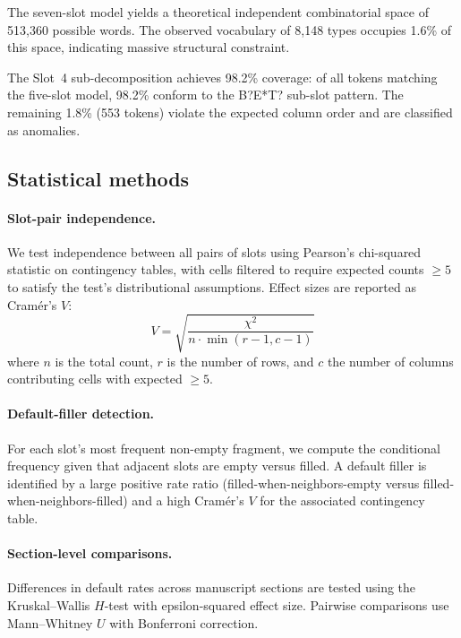 \documentclass[12pt]{article}
\begin{document}
The seven-slot model yields a theoretical independent combinatorial space of 513,360 possible words. The observed vocabulary of 8,148 types occupies 1.6\% of this space, indicating massive structural constraint.

The Slot~4 sub-decomposition achieves 98.2\% coverage: of all tokens matching the five-slot model, 98.2\% conform to the B?E*T? sub-slot pattern. The remaining 1.8\% (553 tokens) violate the expected column order and are classified as anomalies.

\subsection{Statistical methods}

\paragraph{Slot-pair independence.} We test independence between all pairs of slots using Pearson's chi-squared statistic on contingency tables, with cells filtered to require expected counts $\geq 5$ to satisfy the test's distributional assumptions. Effect sizes are reported as Cram\'{e}r's $V$:
\begin{equation}
  V = \sqrt{\frac{\chi^2}{n \cdot \min(r-1, c-1)}}
  \label{eq:cramersv}
\end{equation}
where $n$ is the total count, $r$ is the number of rows, and $c$ the number of columns contributing cells with expected $\geq 5$.

\paragraph{Default-filler detection.} For each slot's most frequent non-empty fragment, we compute the conditional frequency given that adjacent slots are empty versus filled. A default filler is identified by a large positive rate ratio (filled-when-neighbors-empty versus filled-when-neighbors-filled) and a high Cram\'{e}r's $V$ for the associated contingency table.

\paragraph{Section-level comparisons.} Differences in default rates across manuscript sections are tested using the Kruskal--Wallis $H$-test with epsilon-squared effect size. Pairwise comparisons use Mann--Whitney $U$ with Bonferroni correction.
\end{document}
